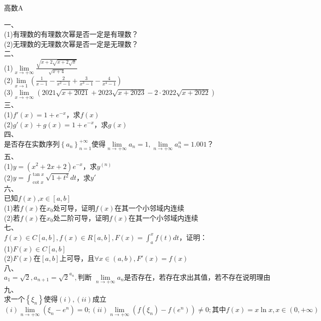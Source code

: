 \documentclass{article}
\begin{document}
	\begin{center}
		高数A
	\end{center}
一、
\\(1)有理数的有理数次幂是否一定是有理数？
\\(2)无理数的无理数次幂是否一定是无理数？
\\二、
\\(1)$\lim\limits_{x \to +\infty} \frac{\sqrt{x+2\sqrt{x+2\sqrt{x}}}}{\sqrt{x+4}}$
\\(2)$\lim\limits_{x \to 1}(\frac{1}{x-1}-\frac{2}{x^2-1}+\frac{3}{x^3-1}-\frac{4}{x^4-1})$
\\(3)$\lim\limits_{x \to +\infty} (2021\sqrt{x+2021}+2023\sqrt{x+2023}-2\cdot2022\sqrt{x+2022})$
\\三、
\\(1)$f'(x)=1+e^{-x}$，求$f(x)$
\\(2)$g'(x)+g(x)=1+e^{-x}$，求$g(x)$
\\四、
\\是否存在实数序列$\left \{ a_{n} \right \} ^{+\infty}_{n=1}$使得$\lim\limits_{n\to +\infty}a_{n}=1,\lim\limits_{n\to +\infty}a_{n}^{n}=1.001$？
\\五、
\\(1)$y=(x^2+2x+2)e^{-x}$，求$y^{(n)}$
\\(2)$y=\int_{\cot{x}}^{\tan{x}}\sqrt{1+t^2}dt$，求$y'$
\\六、
\\已知$f(x)$,$x\in[a,b]$
\\(1)若$f(x)$在$x_{0}$处可导，证明$f(x)$在其一个小邻域内连续
\\(2)若$f(x)$在$x_{0}$处二阶可导，证明$f(x)$在其一个小邻域内连续
\\七、
\\$f(x)\in C[a,b],f(x) \in R[a,b],F(x)=\int_{a}^{x}f(t)dt$，证明：
\\(1)$F(x) \in C[a,b]$
\\(2)$F(x)$在$[a,b]$上可导，且$\forall x \in (a,b),F'(x)=f(x)$
\\八、
\\$a_1=\sqrt{2},a_{n+1}=\sqrt{2}^{a_n},\text{判断 }\lim\limits_{n\to +\infty}a_n \text{是否存在，若存在求出其值，若不存在说明理由}$
\\九、
\\求一个$\left\{{\xi_{n}}\right\}$使得$(i),(ii)$成立
\\$(i) \lim\limits_{n\to +\infty}(\xi_n-e^n)=0;(ii)\lim\limits_{n\to +\infty}(f(\xi_n)-f(e^n))\neq0;\text{其中}f(x)=x\ln x,x\in (0,+\infty)$
\end{document}

